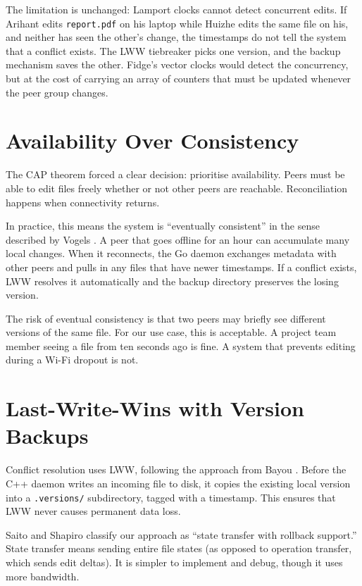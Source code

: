 The limitation is unchanged: Lamport clocks cannot detect concurrent edits. If Arihant edits \texttt{report.pdf} on his laptop while Huizhe edits the same file on his, and neither has seen the other's change, the timestamps do not tell the system that a conflict exists. The LWW tiebreaker picks one version, and the backup mechanism saves the other. Fidge's \citeyear{fidge1988} vector clocks would detect the concurrency, but at the cost of carrying an array of counters that must be updated whenever the peer group changes.

\section{Availability Over Consistency}

The CAP theorem \cite{brewer2002} forced a clear decision: prioritise availability. Peers must be able to edit files freely whether or not other peers are reachable. Reconciliation happens when connectivity returns.

In practice, this means the system is ``eventually consistent'' in the sense described by Vogels \citeyear{vogels2009}. A peer that goes offline for an hour can accumulate many local changes. When it reconnects, the Go daemon exchanges metadata with other peers and pulls in any files that have newer timestamps. If a conflict exists, LWW resolves it automatically and the backup directory preserves the losing version.

The risk of eventual consistency is that two peers may briefly see different versions of the same file. For our use case, this is acceptable. A project team member seeing a file from ten seconds ago is fine. A system that prevents editing during a Wi-Fi dropout is not.

\section{Last-Write-Wins with Version Backups}

Conflict resolution uses LWW, following the approach from Bayou \cite{bayou1995}. Before the C++ daemon writes an incoming file to disk, it copies the existing local version into a \texttt{.versions/} subdirectory, tagged with a timestamp. This ensures that LWW never causes permanent data loss.

Saito and Shapiro \citeyear{saito2005} classify our approach as ``state transfer with rollback support.'' State transfer means sending entire file states (as opposed to operation transfer, which sends edit deltas). It is simpler to implement and debug, though it uses more bandwidth.

